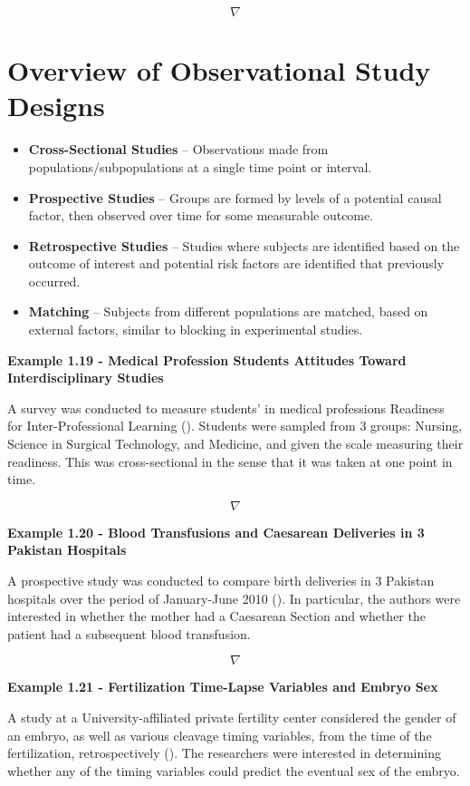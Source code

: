 \documentclass[
]{book}
\providecommand{\tightlist}{%
  \setlength{\itemsep}{0pt}\setlength{\parskip}{0pt}}
\begin{document}
\[\nabla\]

\section{Overview of Observational Study
Designs}\label{overview-of-observational-study-designs}

\begin{itemize}
\tightlist
\item
  \textbf{Cross-Sectional Studies} -- Observations made from
  populations/subpopulations at a single time point or interval.
\item
  \textbf{Prospective Studies} -- Groups are formed by levels of a
  potential causal factor, then observed over time for some measurable
  outcome.
\item
  \textbf{Retrospective Studies} -- Studies where subjects are
  identified based on the outcome of interest and potential risk factors
  are identified that previously occurred.
\item
  \textbf{Matching} -- Subjects from different populations are matched,
  based on external factors, similar to blocking in experimental
  studies.
\end{itemize}

\textbf{Example 1.19 - Medical Profession Students Attitudes Toward
Interdisciplinary Studies}

A survey was conducted to measure students' in medical professions
Readiness for Inter-Professional Learning
().
Students were sampled from 3 groups: Nursing, Science in Surgical
Technology, and Medicine, and given the scale measuring their readiness.
This was cross-sectional in the sense that it was taken at one point in
time.

\[\nabla\]

\textbf{Example 1.20 - Blood Transfusions and Caesarean Deliveries in 3
Pakistan Hospitals}

A prospective study was conducted to compare birth deliveries in 3
Pakistan hospitals over the period of January-June 2010
(). In particular, the
authors were interested in whether the mother had a Caesarean Section
and whether the patient had a subsequent blood transfusion.

\[\nabla\]

\textbf{Example 1.21 - Fertilization Time-Lapse Variables and Embryo
Sex}

A study at a University-affiliated private fertility center considered
the gender of an embryo, as well as various cleavage timing variables,
from the time of the fertilization, retrospectively
(). The researchers were
interested in determining whether any of the timing variables could
predict the eventual sex of the embryo.
\end{document}
